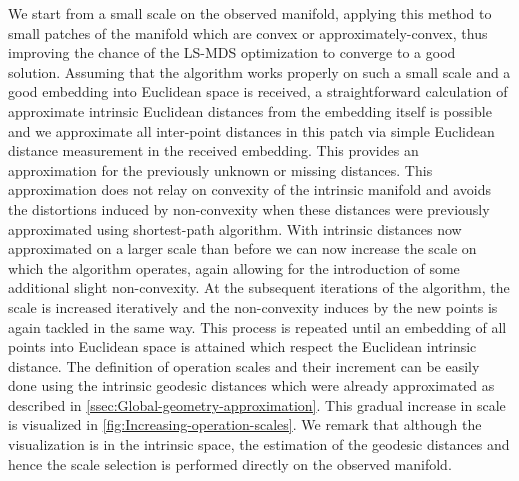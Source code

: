 	We start from a small scale on the observed manifold, applying this method to small patches of the manifold which are convex or approximately-convex, thus improving the chance of the \ac{LS-MDS} optimization to converge to a good solution. Assuming that the algorithm works properly on such a small scale and a good embedding into Euclidean space is received, a straightforward calculation of approximate intrinsic Euclidean distances from the embedding itself is possible and we approximate all inter-point distances in this patch via simple Euclidean distance measurement in the received embedding. This provides an approximation for the previously unknown or missing distances. This approximation does not relay on convexity of the intrinsic manifold and avoids the distortions induced by non-convexity when these distances were previously approximated using shortest-path algorithm. With intrinsic distances now approximated on a larger scale than before we can now increase the scale on which the algorithm operates, again allowing for the introduction of some additional slight non-convexity. At the subsequent iterations of the algorithm, the scale is increased iteratively and the non-convexity induces by the new points is again tackled in the same way. This process is repeated until an embedding of all points into Euclidean space is attained which respect the Euclidean intrinsic distance. The definition of operation scales and their increment can be easily done using the intrinsic geodesic distances which were already approximated as described in \cref{ssec:Global-geometry-approximation}. This gradual increase in scale is visualized in \cref{fig:Increasing-operation-scales}. We remark that although the visualization is in the intrinsic space, the estimation of the geodesic distances and hence the scale selection is performed directly on the observed manifold.
	
